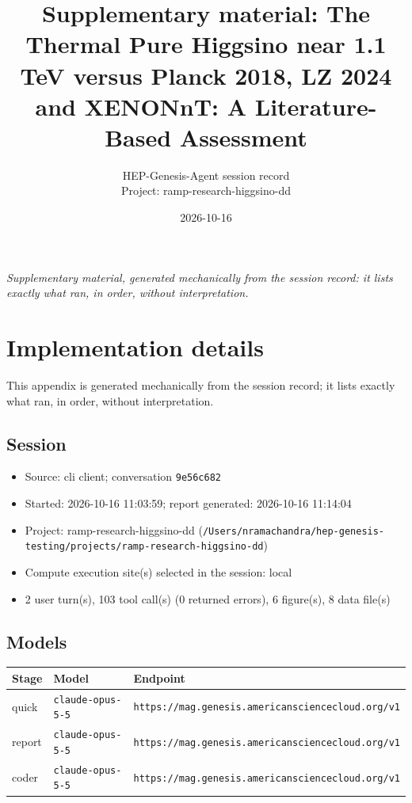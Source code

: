 \documentclass[11pt,a4paper]{article}
\title{Supplementary material: The Thermal Pure Higgsino near 1.1 TeV versus Planck 2018, LZ 2024 and XENONnT: A Literature-Based Assessment}
\author{HEP-Genesis-Agent session record \\ \small Project: ramp-research-higgsino-dd}
\date{2026-10-16}
\begin{document}
\maketitle
\noindent\textit{\small Supplementary material, generated mechanically from the session record: it lists exactly what ran, in order, without interpretation.}
\vspace{1em}



\appendix
\section{Implementation details}
\label{app:impl}
This appendix is generated mechanically from the session record; it lists exactly what ran, in order, without interpretation.
\subsection{Session}
\begin{itemize}
  \item Source: cli client; conversation \texttt{9e56c682}
  \item Started: 2026-10-16 11:03:59; report generated: 2026-10-16 11:14:04
  \item Project: ramp-research-higgsino-dd (\texttt{/\allowbreak{}Users/\allowbreak{}nramachandra/\allowbreak{}hep-genesis-testing/\allowbreak{}projects/\allowbreak{}ramp-research-higgsino-dd})
  \item Compute execution site(s) selected in the session: local
  \item 2 user turn(s), 103 tool call(s) (0 returned errors), 6 figure(s), 8 data file(s)
\end{itemize}
\subsection{Models}
\begin{longtable}{@{}p{}p{}p{}@{}}
\toprule Stage & Model & Endpoint \\ \midrule \endhead
quick & \texttt{claude-opus-5-5} & \texttt{https:\allowbreak{}/\allowbreak{}/\allowbreak{}mag.genesis.americansciencecloud.org/\allowbreak{}v1} \\
report & \texttt{claude-opus-5-5} & \texttt{https:\allowbreak{}/\allowbreak{}/\allowbreak{}mag.genesis.americansciencecloud.org/\allowbreak{}v1} \\
coder & \texttt{claude-opus-5-5} & \texttt{https:\allowbreak{}/\allowbreak{}/\allowbreak{}mag.genesis.americansciencecloud.org/\allowbreak{}v1} \\
\bottomrule\end{longtable}
\end{document}
